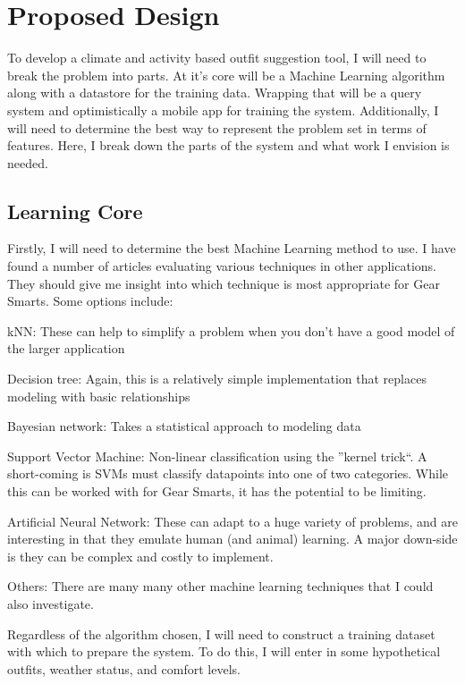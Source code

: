 \section{Proposed Design}
\label{section:propeseddesign}
To develop a climate and activity based outfit suggestion tool, I will need to break the problem into parts.
At it's core will be a Machine Learning algorithm along with a datastore for the training data. Wrapping that will
be a query system and optimistically a mobile app for training the system. Additionally, I will need to determine 
the best way to represent the problem set in terms of features. Here, I break down the parts of the system and what
work I envision is needed.

\subsection{Learning Core}
Firstly, I will need to determine the best Machine Learning method to use. I have found a number of articles evaluating
various techniques in other applications. They should give me insight into which technique is most appropriate for Gear
Smarts. Some options include:

\begin{description}
  \item{kNN:} These can help to simplify a problem when you don't have a good model of the larger application
  \item{Decision tree:} Again, this is a relatively simple implementation that replaces modeling with basic relationships
  \item{Bayesian network:} Takes a statistical approach to modeling data
  \item{Support Vector Machine:} Non-linear classification using the ''kernel trick``. A short-coming is SVMs must classify
  datapoints into one of two categories. While this can be worked with for Gear Smarts, it has the potential to be limiting.
  \item{Artificial Neural Network:} These can adapt to a huge variety of problems, and are interesting in that they emulate
  human (and animal) learning. A major down-side is they can be complex and costly to implement.
  \item{Others:} There are many many other machine learning techniques that I could also investigate.
\end{description}

Regardless of the algorithm chosen, I will need to construct a training dataset with which to prepare the system. To do this,
I will enter in some hypothetical outfits, weather status, and comfort levels.

